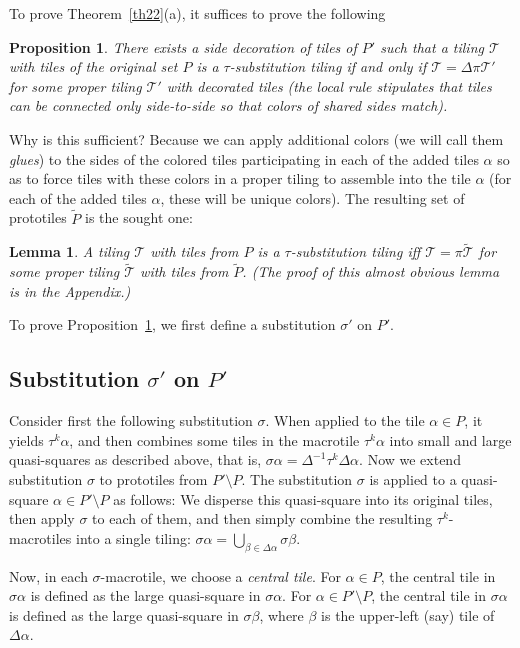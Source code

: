 \documentclass[12pt]{article}
\newtheorem{lemma}{Lemma}
\newtheorem{prop}{Proposition}
\theoremstyle{remark}
\begin{document}
To prove Theorem~\ref{th22}(a), it suffices to prove the following 
\begin{prop}\label{th5} There exists a side decoration
of tiles of $P'$ such that a tiling $\mathcal T$ with tiles of the original set $P$ is a $\tau$-substitution tiling 
if and only if $\mathcal T=\Delta\pi\mathcal T'$ for some proper tiling 
$\mathcal T'$ with  decorated tiles (the local rule stipulates that tiles can be connected only side-to-side so that
colors of shared sides match).
\end{prop}
Why is this sufficient? Because we can apply additional colors (we will call them \emph{glues}) to the sides of the colored tiles participating
in each of the added tiles $\alpha$ so as to force
tiles with these colors in a proper tiling to assemble
into the tile $\alpha$ (for each of the added tiles $\alpha$, these will be unique colors).
The resulting set of prototiles $\tilde P$ is the sought one:
\begin{lemma}\label{claim-prop1}
A tiling $\mathcal T$ with tiles from $P$ is a $\tau$-substitution tiling iff $\mathcal T=\pi\tilde{\mathcal T}$
for some proper tiling $\tilde{\mathcal T}$ with tiles from $\tilde P$.
(The proof of this almost obvious lemma is in the Appendix.)
\end{lemma}

To prove Proposition~\ref{th5}, we first define a substitution
$\sigma'$ on $P'$.

\subsection{Substitution $\sigma'$ on $P'$}

Consider first the following substitution $\sigma$. When applied
to the tile $\alpha\in P$, it yields $\tau^k\alpha$, and then combines some tiles in the macrotile
$\tau^k\alpha$ into small and large quasi-squares as described above, that is,
$\sigma\alpha=\Delta^{-1}\tau^k\Delta\alpha$.
Now we extend  substitution $\sigma$ to prototiles from $P'\setminus P$.
The substitution $\sigma$ is applied to a quasi-square $\alpha\in P'\setminus P$ as follows:
We disperse this quasi-square into its original tiles, then apply $\sigma$ to each of them, and then simply combine the resulting 
$\tau^k$-macrotiles into a single tiling:
$\sigma\alpha=\bigcup_{\beta\in\Delta\alpha}\sigma\beta$.

Now, in each $\sigma$-macrotile, we choose a \emph{central tile}.
For $\alpha\in P$, the central tile in $\sigma\alpha$
is defined as the large quasi-square in $\sigma\alpha$.
For $\alpha\in P'\setminus P$, the central tile in $\sigma\alpha$
is defined as the large quasi-square in $\sigma\beta$, where $\beta$ is the upper-left (say) tile
of $\Delta\alpha$.
\end{document}
